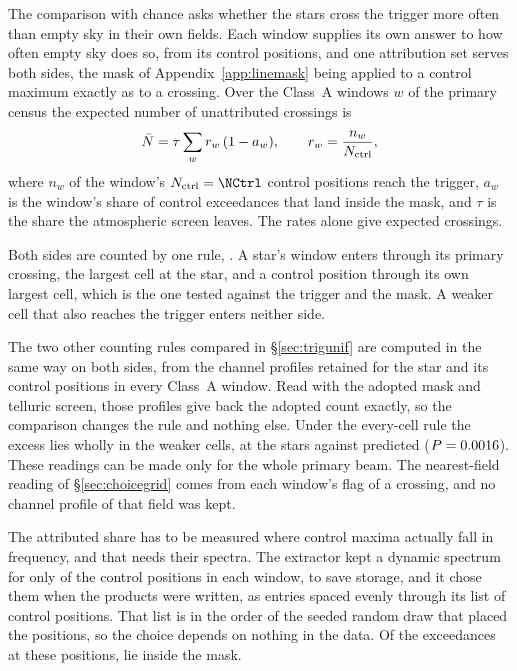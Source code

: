 The comparison with chance asks whether the stars cross the trigger more
often than empty sky in their own fields. Each window supplies
its own answer to how often empty sky does so, from its control positions,
and one attribution set serves both sides, the mask of
Appendix~\ref{app:linemask} being applied to a control maximum exactly as to
a crossing. Over the \CeNWin{} Class~A windows $w$ of the primary census the
expected number of unattributed crossings is
\begin{equation*}
\bar N=\tau\sum_{w}r_w\,(1-a_w),\qquad r_w=\frac{n_w}{N_{\rm ctrl}},
\end{equation*}
where $n_w$ of the window's $N_{\rm ctrl}=\NCtrl$ control positions reach the
trigger, $a_w$ is the window's share of control exceedances that land
inside the mask, and $\tau$ is the share the atmospheric screen leaves. The rates alone
give \CeExpTrig{} expected crossings.

Both sides are counted by one rule, \AcRulePrimary. A star's window
enters through its primary crossing, the largest cell at the star, and a
control position through its own largest cell, which is the one tested
against the trigger and the mask. A weaker cell that also reaches the
trigger enters neither side.

The two other counting rules compared in \S\ref{sec:trigunif} are computed
in the same way on both sides, from the channel profiles retained for the
star and its control positions in every Class~A window. Read with the
adopted mask and telluric screen, those profiles give back the adopted
count exactly, so the comparison changes the rule and nothing else. Under
the every-cell rule the excess lies wholly in the weaker cells,
\AcStarSecNWord{} at the stars against \AcSecExp{} predicted
($P=0.0016$). These readings can be made only for the whole primary
beam. The nearest-field reading of \S\ref{sec:choicegrid} comes from each
window's flag of a crossing, and no channel profile of that field was kept.

The attributed share has to be measured where control maxima actually fall
in frequency, and that needs their spectra. The extractor kept a dynamic
spectrum for only \RcNRetCtrl{} of the control positions in each window, to
save storage, and it chose them when the products were written, as entries
spaced evenly through its list of control positions. That list is in the
order of the seeded random draw that placed the positions, so the choice
depends on nothing in the data. Of the \CeNExc{} exceedances at these
positions, \CeNExcAttr{} lie inside the mask.

